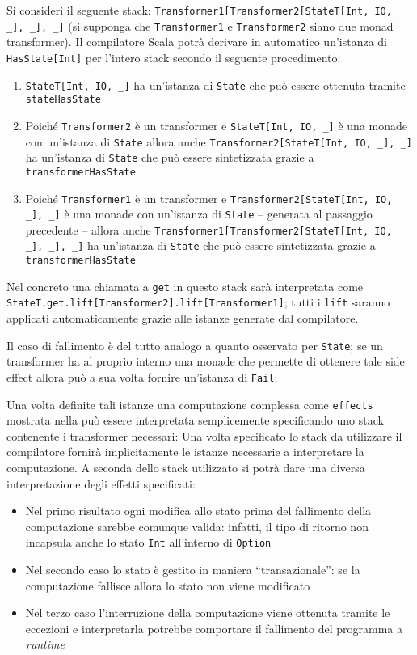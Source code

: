 Si consideri il seguente stack: \lstinline{Transformer1[Transformer2[StateT[Int, IO, _], _], _]} (si supponga che \lstinline{Transformer1} e \lstinline{Transformer2} siano due monad transformer). Il compilatore Scala potrà derivare in automatico un'istanza di \lstinline{HasState[Int]} per l'intero stack secondo il seguente procedimento:
\begin{enumerate}
  \item \lstinline{StateT[Int, IO, _]} ha un'istanza di \lstinline{State} che può essere ottenuta tramite \lstinline{stateHasState}
  \item Poiché \lstinline{Transformer2} è un transformer e \lstinline{StateT[Int, IO, _]} è una monade con un'istanza di \lstinline{State} allora anche \lstinline{Transformer2[StateT[Int, IO, _], _]} ha un'istanza di \lstinline{State} che può essere sintetizzata grazie a \lstinline{transformerHasState}
  \item Poiché \lstinline{Transformer1} è un transformer e \lstinline{Transformer2[StateT[Int, IO, _], _]} è una monade con un'istanza di \lstinline{State} -- generata al passaggio precedente -- allora anche \lstinline{Transformer1[Transformer2[StateT[Int, IO, _], _], _]} ha un'istanza di \lstinline{State} che può essere sintetizzata grazie a \lstinline{transformerHasState}
\end{enumerate}

Nel concreto una chiamata a \lstinline{get} in questo stack sarà interpretata come \lstinline{StateT.get.lift[Transformer2].lift[Transformer1]}; tutti i \lstinline{lift} saranno applicati automaticamente grazie alle istanze generate dal compilatore.

Il caso di fallimento è del tutto analogo a quanto osservato per \lstinline{State}; se un transformer ha al proprio interno una monade che permette di ottenere tale side effect allora può a sua volta fornire un'istanza di \lstinline{Fail}:

Una volta definite tali istanze una computazione complessa come \lstinline{effects} mostrata nella  può essere interpretata semplicemente specificando uno stack contenente i transformer necessari:
Una volta specificato lo stack da utilizzare il compilatore fornirà implicitamente le istanze necessarie a interpretare la computazione. A seconda dello stack utilizzato si potrà dare una diversa interpretazione degli effetti specificati:
\begin{itemize}
  \item Nel primo risultato ogni modifica allo stato prima del fallimento della computazione sarebbe comunque valida: infatti, il tipo di ritorno non incapsula anche lo stato \lstinline{Int} all'interno di \lstinline{Option}
  \item Nel secondo caso lo stato è gestito in maniera ``transazionale'': se la computazione fallisce allora lo stato non viene modificato
  \item Nel terzo caso l'interruzione della computazione viene ottenuta tramite le eccezioni e interpretarla potrebbe comportare il fallimento del programma a \emph{runtime}
\end{itemize}
